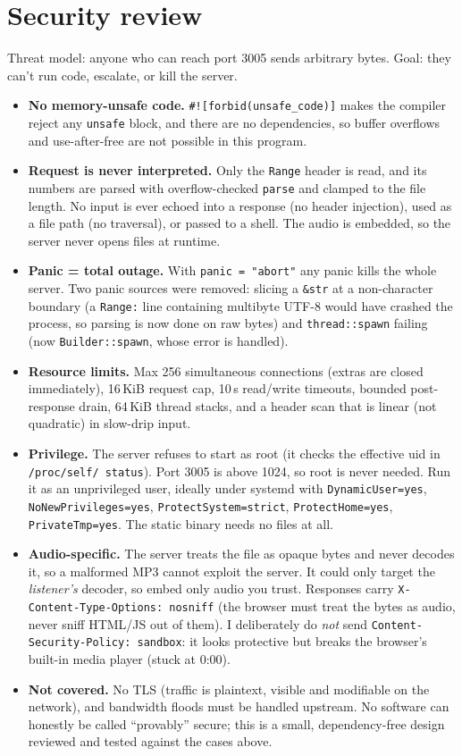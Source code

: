 \documentclass[11pt]{article}
\begin{document}
\section{Security review}
Threat model: anyone who can reach port 3005 sends arbitrary bytes. Goal: they can't run code, escalate, or kill the server.
\begin{itemize}
\item \textbf{No memory-unsafe code.} \texttt{\#![forbid(unsafe\_code)]} makes the compiler reject any \texttt{unsafe} block, and there are no dependencies, so buffer overflows and use-after-free are not possible in this program.
\item \textbf{Request is never interpreted.} Only the \texttt{Range} header is read, and its numbers are parsed with overflow-checked \texttt{parse} and clamped to the file length. No input is ever echoed into a response (no header injection), used as a file path (no traversal), or passed to a shell. The audio is embedded, so the server never opens files at runtime.
\item \textbf{Panic = total outage.} With \texttt{panic = "abort"} any panic kills the whole server. Two panic sources were removed: slicing a \texttt{\&str} at a non-character boundary (a \texttt{Range:} line containing multibyte UTF-8 would have crashed the process, so parsing is now done on raw bytes) and \texttt{thread::spawn} failing (now \texttt{Builder::spawn}, whose error is handled).
\item \textbf{Resource limits.} Max 256 simultaneous connections (extras are closed immediately), 16\,KiB request cap, 10\,s read/write timeouts, bounded post-response drain, 64\,KiB thread stacks, and a header scan that is linear (not quadratic) in slow-drip input.
\item \textbf{Privilege.} The server refuses to start as root (it checks the effective uid in \texttt{/proc/self/ status}). Port 3005 is above 1024, so root is never needed. Run it as an unprivileged user, ideally under systemd with \texttt{DynamicUser=yes}, \texttt{NoNewPrivileges=yes}, \texttt{ProtectSystem=strict}, \texttt{ProtectHome=yes}, \texttt{PrivateTmp=yes}. The static binary needs no files at all.
\item \textbf{Audio-specific.} The server treats the file as opaque bytes and never decodes it, so a malformed MP3 cannot exploit the server. It could only target the \emph{listener's} decoder, so embed only audio you trust. Responses carry \texttt{X-Content-Type-Options: nosniff} (the browser must treat the bytes as audio, never sniff HTML/JS out of them). I deliberately do \emph{not} send \texttt{Content-Security-Policy: sandbox}: it looks protective but breaks the browser's built-in media player (stuck at 0:00).
\item \textbf{Not covered.} No TLS (traffic is plaintext, visible and modifiable on the network), and bandwidth floods must be handled upstream. No software can honestly be called ``provably'' secure; this is a small, dependency-free design reviewed and tested against the cases above.
\end{itemize}
\end{document}
